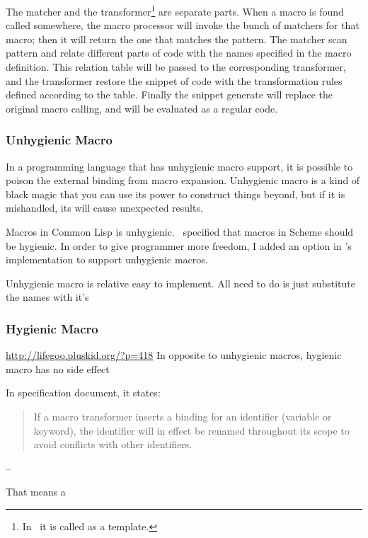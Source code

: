 The matcher and the transformer\footnote{In \revo\ it is called as a
template.} are separate parts. When a macro is found called somewhere,
the macro processor will invoke the bunch of matchers for that macro;
then it will return the one that matches the pattern. The matcher scan
pattern and relate different parts of code with the names specified in
the macro definition. This relation table will be passed to the
corresponding transformer, and the transformer restore the snippet of
code with the transformation rules defined according to the
table. Finally the snippet generate will replace the original macro
calling, and will be evaluated as a regular code.

\subsubsection{Unhygienic Macro}
In a programming language that has unhygienic macro support, it is
possible to poison the external binding from macro
expansion. Unhygienic macro is a kind of black magic that you can use
its power to construct things beyond, but if it is mishandled, its will
cause unexpected results.

Macros in Common Lisp is unhygienic. \RFIVERS\ specified that
macros in Scheme should be hygienic. In order to give programmer more
freedom, I added an option in \revo's implementation to support
unhygienic macros.

Unhygienic macro is relative easy to implement. All need to do is just
substitute the names with it's


\subsubsection{Hygienic Macro}
\url{http://lifegoo.pluskid.org/?p=418}
In opposite to unhygienic macros, hygienic macro has no side effect

In specification document, it states:
\begin{quote}
If a macro transformer inserts a binding for an identifier (variable
or keyword), the identifier will in effect be renamed throughout its
scope to avoid conflicts with other identifiers.
\end{quote}
\begin{flushright}
--\href{http://www.schemers.org/Documents/Standards/R5RS/HTML/r5rs-Z-H-7\.html\#\%\_sec\_4\.3}{\RFIVERS}
\end{flushright}

That means a

